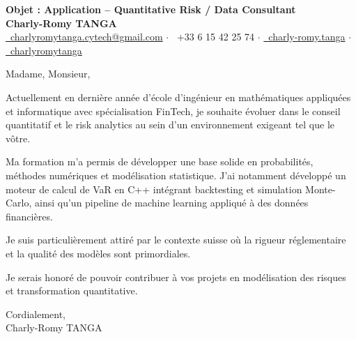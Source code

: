 \documentclass[10pt, letterpaper]{article}
\begin{document}
\begin{center}
\textbf{\LARGE Objet : Application -- Quantitative Risk / Data Consultant}\\[0.2cm]
\textbf{\large Charly-Romy TANGA}\\[0.2cm]
\href{mailto:charlyromytanga.cytech@gmail.com}{\faEnvelope\ charlyromytanga.cytech@gmail.com} \quad$\cdot$\quad
\faPhone\ +33 6 15 42 25 74 \quad$\cdot$\quad
\href{https://www.linkedin.com/in/charly-romy-tanga}{\faLinkedin\ charly-romy.tanga} \quad$\cdot$\quad
\href{https://github.com/charlyromytanga}{\faGithub\ charlyromytanga}
\end{center}
Madame, Monsieur,

Actuellement en dernière année d'école d'ingénieur en mathématiques appliquées et informatique avec spécialisation FinTech, je souhaite évoluer dans le conseil quantitatif et le risk analytics au sein d'un environnement exigeant tel que le vôtre.

Ma formation m'a permis de développer une base solide en probabilités, méthodes numériques et modélisation statistique. J'ai notamment développé un moteur de calcul de VaR en C++ intégrant backtesting et simulation Monte-Carlo, ainsi qu'un pipeline de machine learning appliqué à des données financières.

Je suis particulièrement attiré par le contexte suisse où la rigueur réglementaire et la qualité des modèles sont primordiales.

Je serais honoré de pouvoir contribuer à vos projets en modélisation des risques et transformation quantitative.

Cordialement,\\
Charly-Romy TANGA
\end{document}
